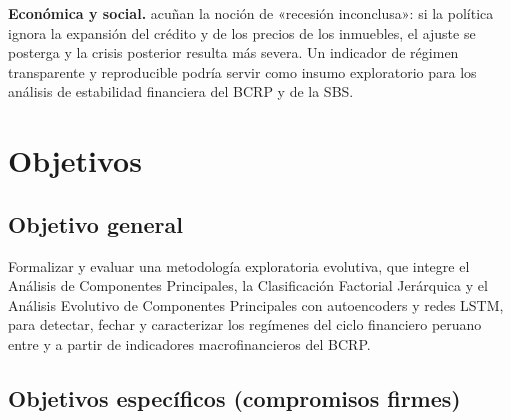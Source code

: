 \textbf{Económica y social.} \textcite{drehmann_borio_tsatsaronis_2012} acuñan la noción de
«recesión inconclusa»: si la política ignora la expansión del crédito y de los precios de los
inmuebles, el ajuste se posterga y la crisis posterior resulta más severa. Un indicador de
régimen transparente y reproducible podría servir como insumo exploratorio para los análisis de
estabilidad financiera del BCRP y de la SBS.

\section{Objetivos}
\label{sec:objetivos}

\subsection{Objetivo general}

Formalizar y evaluar una metodología exploratoria evolutiva, que integre el Análisis de
Componentes Principales, la Clasificación Factorial Jerárquica y el Análisis Evolutivo de
Componentes Principales con autoencoders y redes LSTM, para detectar, fechar y caracterizar los
regímenes del ciclo financiero peruano entre \anioInicioDatos{} y \anioFinDatos{} a partir de
indicadores macrofinancieros del BCRP.

\subsection{Objetivos específicos (compromisos firmes)}
\label{sec:oe}

